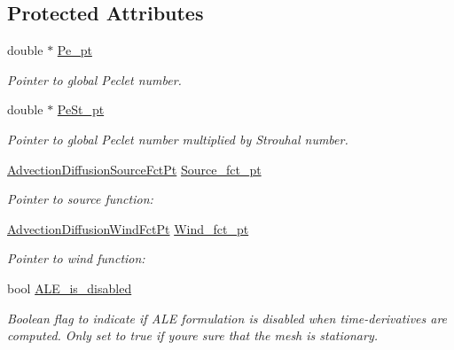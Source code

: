 \subsection*{Protected Attributes}
\begin{DoxyCompactItemize}
\item 
double $\ast$ \hyperlink{classoomph_1_1AdvectionDiffusionEquations_a3b712468732df04ff28d4efe0bd5cbe5}{Pe\+\_\+pt}
\begin{DoxyCompactList}\small\item\em Pointer to global Peclet number. \end{DoxyCompactList}\item 
double $\ast$ \hyperlink{classoomph_1_1AdvectionDiffusionEquations_aa9368fa0d1bd18604c9482b14022502f}{Pe\+St\+\_\+pt}
\begin{DoxyCompactList}\small\item\em Pointer to global Peclet number multiplied by Strouhal number. \end{DoxyCompactList}\item 
\hyperlink{classoomph_1_1AdvectionDiffusionEquations_aa892578e0cffe209775da9f5ac84bd03}{Advection\+Diffusion\+Source\+Fct\+Pt} \hyperlink{classoomph_1_1AdvectionDiffusionEquations_a7c6a2bebf33ebc0ad7ec2aea03c8804b}{Source\+\_\+fct\+\_\+pt}
\begin{DoxyCompactList}\small\item\em Pointer to source function\+: \end{DoxyCompactList}\item 
\hyperlink{classoomph_1_1AdvectionDiffusionEquations_a341db90b2eaf704f3286a9fcde7c614a}{Advection\+Diffusion\+Wind\+Fct\+Pt} \hyperlink{classoomph_1_1AdvectionDiffusionEquations_a9e8d2e67d6d5738f811a40391ceda9aa}{Wind\+\_\+fct\+\_\+pt}
\begin{DoxyCompactList}\small\item\em Pointer to wind function\+: \end{DoxyCompactList}\item 
bool \hyperlink{classoomph_1_1AdvectionDiffusionEquations_a049fe0ee23a9dda3de6edb2ca582e48c}{A\+L\+E\+\_\+is\+\_\+disabled}
\begin{DoxyCompactList}\small\item\em Boolean flag to indicate if A\+LE formulation is disabled when time-\/derivatives are computed. Only set to true if you\textquotesingle{}re sure that the mesh is stationary. \end{DoxyCompactList}\end{DoxyCompactItemize}
